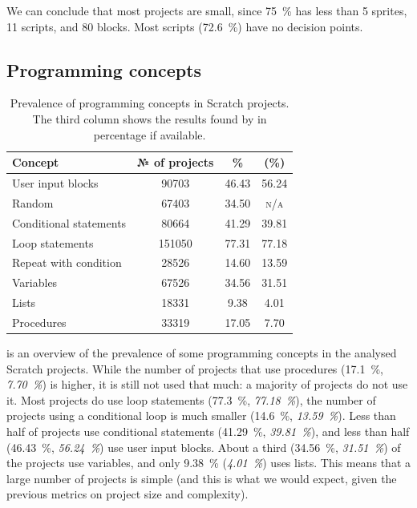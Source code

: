 \documentclass[../main]{subfiles}
\begin{document}
We can conclude that most projects are small, since \qty{75}{\percent} has less than 5 sprites, 11 scripts, and 80 blocks.
Most scripts (\qty{72.6}{\percent}) have no decision points.

\subsection{Programming concepts}\label{subsec:programming-concepts}

\begin{table}
    \centering
    \caption{
        Prevalence of programming concepts in Scratch projects.
        The third column shows the results found by \textcite{aivaloglouHowKidsCode2016} in percentage if available.
    }
    \label{tab:scratch-programming-concepts}
    \begin{tabular}{|l|S[table-format=6.0] S|S|}
        \hline
        {Concept} & {№ of projects} & \% & {\citeauthor{aivaloglouHowKidsCode2016} (\%)} \\
        \hline
        User input blocks & 90703 & 46.43 & 56.24  \\
        Random & 67403 & 34.50 & {\textsc{n/a}} \\
        \hline
        Conditional statements & 80664 & 41.29 & 39.81 \\
        Loop statements & 151050 & 77.31 & 77.18 \\
        Repeat with condition & 28526 & 14.60 & 13.59 \\
        \hline
        Variables & 67526 & 34.56 & 31.51 \\
        Lists & 18331 & 9.38 & 4.01 \\
        \hline
        Procedures & 33319 & 17.05 & 7.70 \\
        \hline
    \end{tabular}
\end{table}

 is an overview of the prevalence of some programming concepts in the analysed Scratch projects.
While the number of projects that use procedures (\qty{17.1}{\percent}, \textit{\qty{7.70}{\percent}}) is higher, it is still not used that much: a majority of projects do not use it.
Most projects do use loop statements (\qty{77.3}{\percent}, \textit{\qty{77.18}{\percent}}), the number of projects using a conditional loop is much smaller (\qty{14.6}{\percent}, \textit{\qty{13.59}{\percent}}).
Less than half of projects use conditional statements (\qty{41.29}{\percent}, \textit{\qty{39.81}{\percent}}), and less than half (\qty{46.43}{\percent}, \textit{\qty{56.24}{\percent}}) use user input blocks.
About a third (\qty{34.56}{\percent}, \textit{\qty{31.51}{\percent}}) of the projects use variables, and only \qty{9.38}{\percent} (\textit{\qty{4.01}{\percent}}) uses lists.
This means that a large number of projects is simple (and this is what we would expect, given the previous metrics on project size and complexity).
\end{document}
